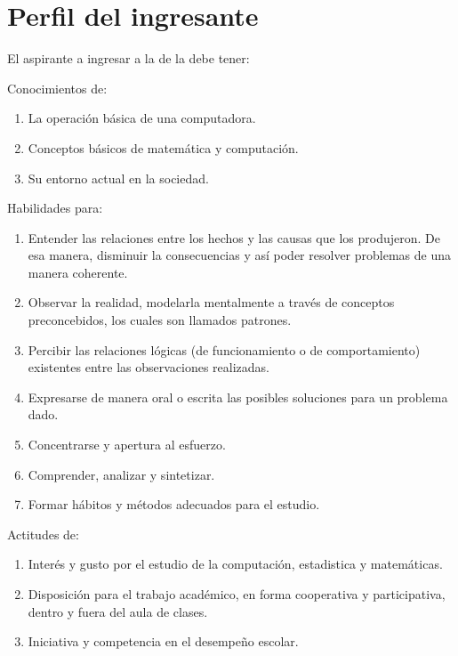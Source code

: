 \section{Perfil del ingresante}

El aspirante a ingresar a la \SchoolFullName de la \University debe tener:

\noindent Conocimientos de:
\begin{enumerate}
\item La operación básica de una computadora.
\item Conceptos básicos de matemática y computación.
\item Su entorno actual en la sociedad.
\end{enumerate}

\noindent Habilidades para:
\begin{enumerate}
\item Entender las relaciones entre los hechos y las causas que los produjeron. De esa manera, disminuir la consecuencias y así poder resolver problemas de una manera coherente.
\item Observar la realidad, modelarla mentalmente a través de conceptos preconcebidos, los cuales son llamados patrones.
\item Percibir las relaciones lógicas (de funcionamiento o de comportamiento) existentes entre las observaciones realizadas.
\item Expresarse de manera oral o escrita las posibles soluciones para un problema dado.
\item Concentrarse y apertura al esfuerzo.
\item Comprender, analizar y sintetizar.
\item Formar hábitos y métodos adecuados para el estudio.
\end{enumerate}

\noindent Actitudes de:
\begin{enumerate}
\item Interés y gusto por el estudio de la computación, estadistica y matemáticas.
\item Disposición para el trabajo académico, en forma cooperativa y participativa, dentro y fuera del aula de clases.
\item Iniciativa y competencia en el desempeño escolar.
\end{enumerate}
